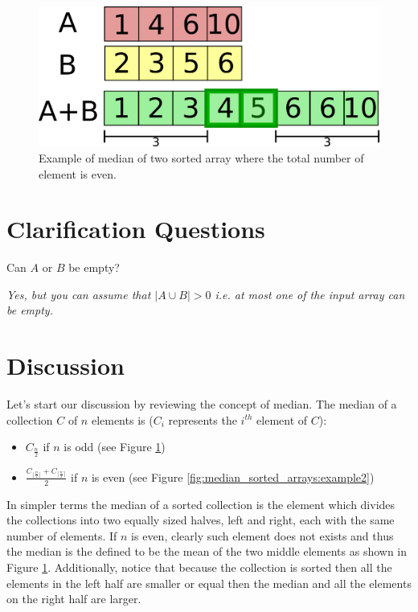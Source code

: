 \begin{figure}
	\label{fig:median_sorted_arrays:example1}
	\centering
	\includegraphics[scale=1.0]{sources/median_sorted_arrays/images/example1}
	\caption[Example of median of two sorted array.]{Example of median of two sorted array where the total number of element is even.}
\end{figure}


\section{Clarification Questions}

\begin{QandA}
	\item \begin{questionitem} \begin{question} Can $A$ or $B$ be empty?  \end{question} 	 
    \begin{answered}
		\textit{Yes, but you can assume that $|A \cup B| > 0$ i.e. at most one of the input array can be empty.}
	\end{answered} \end{questionitem}
	
\end{QandA}

\section{Discussion}
\label{median_sorted_arrays:sec:discussion}
Let's start our discussion by reviewing the concept of median. The median of a collection $C$ of $n$
elements is ($C_i$ represents the $i^{th}$ element of $C$):
\begin{itemize}
	\item $C_{\frac{n}{2}}$ if $n$ is odd (see Figure \ref{fig:median_sorted_arrays:example1})
	\item $\frac{C_{ \lfloor \frac{n}{2} \rfloor    }+C_{ \lceil \frac{n}{2} \rceil   }}{2}$ if $n$ is even (see Figure
	\ref{fig:median_sorted_arrays:example2})
\end{itemize}
In simpler terms the median of a sorted collection is the element which divides the collections into
two equally sized halves, left and right, each with the same number of elements. 
If $n$ is even, clearly such element does not exists and thus the median is the defined to be the mean of the two middle
elements as shown in Figure \ref{fig:median_sorted_arrays:example1}.
Additionally, notice that because the collection is sorted then all the elements in the left half are smaller or equal then
the median and all the elements on the right half are larger. 

